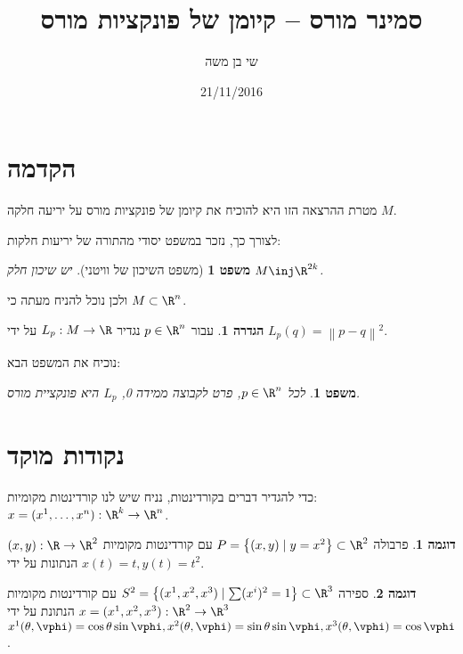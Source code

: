 \documentclass{article}
\title{סמינר מורס – קיומן של פונקציות מורס}
\author{שי בן משה}
\date{21/11/2016}
\newtheorem{theorem}{משפט}
\newtheorem*{theorem*}{משפט}
\theoremstyle{definition}
\newtheorem*{definition*}{הגדרה}
\newtheorem*{example*}{דוגמה}
\newcommand{\norm}[1]{\left\lVert#1\right\rVert}
\begin{document}
	\maketitle
	
	
	\section{הקדמה}
	
	מטרת ההרצאה הזו היא להוכיח את קיומן של פונקציות מורס על יריעה חלקה \(M\).
	
	לצורך כך, נזכר במשפט יסודי מהתורה של יריעות חלקות:
	\begin{theorem*}[משפט השיכון של וויטני]
		יש שיכון חלק
		\(M \inj \R^{2k}\).
	\end{theorem*}
	ולכן נוכל להניח מעתה כי
	\(M\subset \R^n\).
	
	\begin{definition*}
		עבור
		\(p\in \R^n\)
		נגדיר
		\(L_p:M\to \R\)
		על ידי
		\(L_p(q)=\norm{p-q}^2\).
	\end{definition*}

	נוכיח את המשפט הבא:
	\begin{theorem}
		לכל
		\(p\in \R^n\),
		פרט לקבוצה ממידה 0, \(L_p\) היא פונקציית מורס.
	\end{theorem}


	\section{נקודות מוקד}
	
	כדי להגדיר דברים בקורדינטות, נניח שיש לנו קורדינטות מקומיות:
	\(x=(x^1,\dotsc,x^n): \R^k \to \R^n\).
	
	\begin{example*}
		פרבולה
		\(P = \left\{(x,y) \mid y=x^2 \right\} \subset \R^2 \)
		עם קורדינטות מקומיות
		\((x,y): \R \to \R^2\)
		הנתונות על ידי
		\(x(t)=t, y(t)=t^2\).
	\end{example*}

	\begin{example*}
		ספירה
		\(S^2 = \left\{(x^1,x^2,x^3) \mid \sum (x^i)^2 = 1 \right\} \subset \R^3 \)
		עם קורדינטות מקומיות
		\(x=(x^1,x^2,x^3): \R^2 \to \R^3\)
		הנתונת על ידי
		\(
			x^1(\theta, \vphi) = \cos\theta \sin\vphi,
			x^2(\theta, \vphi) = \sin\theta \sin\vphi,
			x^3(\theta, \vphi) = \cos\vphi
		\).
	\end{example*}
	
\end{document}
